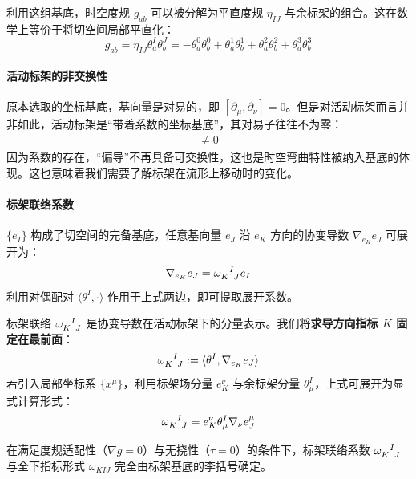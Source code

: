 利用这组基底，时空度规 $g_{ab}$ 可以被分解为平直度规 $\eta_{IJ}$ 与余标架的组合。这在数学上等价于将切空间局部平直化：
\begin{equation}
    g_{ab} = \eta_{IJ} \theta^I_a \theta^J_b = -\theta^0_a \theta^0_b + \theta^1_a \theta^1_b + \theta^2_a \theta^2_b + \theta^3_a \theta^3_b
\end{equation}
\paragraph{活动标架的非交换性} 
原本选取的坐标基底，基向量是对易的，即 $[\partial_\mu, \partial_\nu] = 0$。但是对活动标架而言并非如此，活动标架是“带着系数的坐标基底”，其对易子往往不为零：
\begin{align*}
    [e_I, e_J] \neq 0
\end{align*}
因为系数的存在，“偏导”不再具备可交换性，这也是时空弯曲特性被纳入基底的体现。这也意味着我们需要了解标架在流形上移动时的变化。
\paragraph{标架联络系数}
$\{e_I\}$ 构成了切空间的完备基底，任意基向量 $e_J$ 沿 $e_K$ 方向的协变导数 $\nabla_{e_K} e_J$ 可展开为：
\begin{equation}
    \nabla_{e_K} e_J = \tensor{\omega}{_K^I_J} e_I
\end{equation}
利用对偶配对 $\langle \theta^I, \cdot \rangle$ 作用于上式两边，即可提取展开系数。

\begin{definition}[标架联络系数的分量表示]
    标架联络 $\tensor{\omega}{_K^I_J}$ 是协变导数在活动标架下的分量表示。我们将\textbf{求导方向指标 $K$ 固定在最前面}：
    \begin{equation}
        \tensor{\omega}{_K^I_J} := \langle \theta^I, \nabla_{e_K} e_J \rangle
    \end{equation}
    若引入局部坐标系 $\{x^\mu\}$，利用标架场分量 $e_K^\nu$ 与余标架分量 $\theta^I_\mu$，上式可展开为显式计算形式：
    \begin{equation}
        \tensor{\omega}{_K^I_J} = e_K^\nu \theta^I_\mu \nabla_\nu e_J^\mu 
    \end{equation}
\end{definition}

\begin{theorem}
    在满足度规适配性（$\nabla g = 0$）与无挠性（$\tau = 0$）的条件下，标架联络系数 $\tensor{\omega}{_K^I_J}$ 与全下指标形式 $\omega_{KIJ}$ 完全由标架基底的李括号确定。
\end{theorem}

